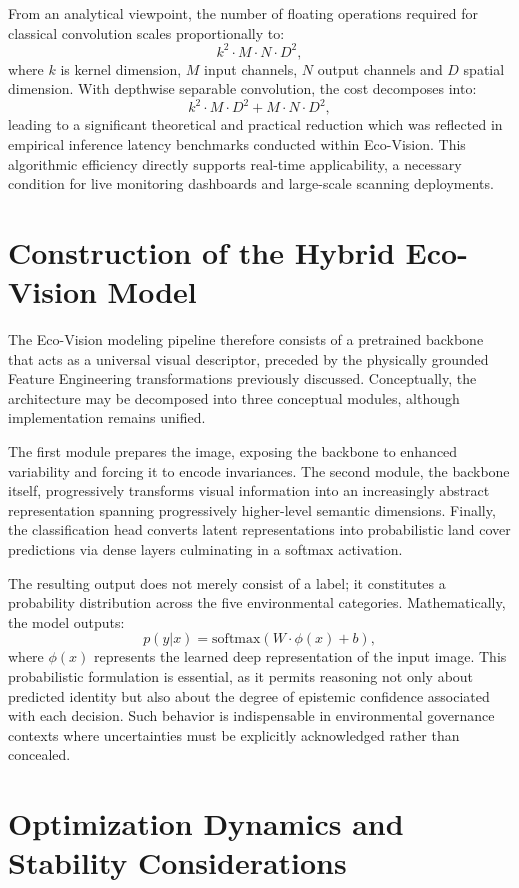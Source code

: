 \documentclass[12pt,a4paper]{report}
\begin{document}
From an analytical viewpoint, the number of floating operations required for classical convolution scales proportionally to:
\[
k^2 \cdot M \cdot N \cdot D^2,
\]
where \(k\) is kernel dimension, \(M\) input channels, \(N\) output channels and \(D\) spatial dimension. With depthwise separable convolution, the cost decomposes into:
\[
k^2 \cdot M \cdot D^2 + M \cdot N \cdot D^2,
\]
leading to a significant theoretical and practical reduction which was reflected in empirical inference latency benchmarks conducted within Eco-Vision. This algorithmic efficiency directly supports real-time applicability, a necessary condition for live monitoring dashboards and large-scale scanning deployments.

\section{Construction of the Hybrid Eco-Vision Model}

The Eco-Vision modeling pipeline therefore consists of a pretrained backbone that acts as a universal visual descriptor, preceded by the physically grounded Feature Engineering transformations previously discussed. Conceptually, the architecture may be decomposed into three conceptual modules, although implementation remains unified.

The first module prepares the image, exposing the backbone to enhanced variability and forcing it to encode invariances. The second module, the backbone itself, progressively transforms visual information into an increasingly abstract representation spanning progressively higher-level semantic dimensions. Finally, the classification head converts latent representations into probabilistic land cover predictions via dense layers culminating in a softmax activation.

The resulting output does not merely consist of a label; it constitutes a probability distribution across the five environmental categories. Mathematically, the model outputs:
\[
p(y|x) = \text{softmax}(W \cdot \phi(x) + b),
\]
where \(\phi(x)\) represents the learned deep representation of the input image. This probabilistic formulation is essential, as it permits reasoning not only about predicted identity but also about the degree of epistemic confidence associated with each decision. Such behavior is indispensable in environmental governance contexts where uncertainties must be explicitly acknowledged rather than concealed.

\section{Optimization Dynamics and Stability Considerations}
\end{document}

